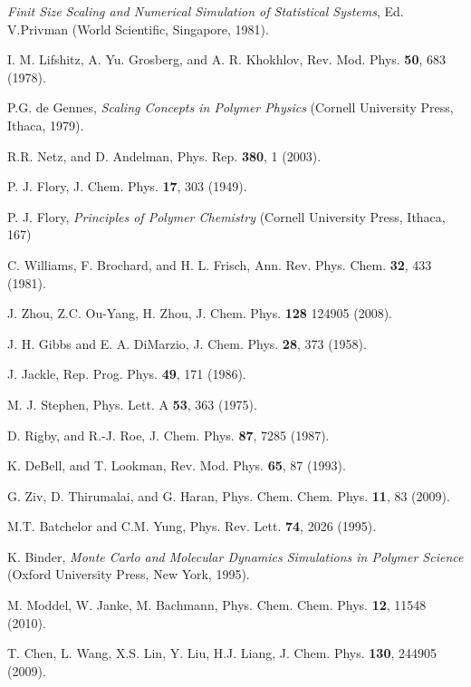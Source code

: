 \documentclass[aps,pre,twocolumn,showpacs,preprintnumbers,amsmath,amssymb]{revtex4-1}
\begin{document}
\begin{thebibliography}{10}

 {\it Finit Size Scaling and Numerical
Simulation of Statistical Systems}, Ed. V.Privman (World
Scientific, Singapore, 1981).


 I. M. Lifshitz, A. Yu. Grosberg, and A.
R. Khokhlov, Rev. Mod. Phys. {\bf 50}, 683 (1978).

 P.G. de Gennes, {\it Scaling Concepts
in Polymer Physics} (Cornell University Press, Ithaca, 1979).

 R.R. Netz, and D. Andelman, Phys. Rep. {\bf
380}, 1 (2003).

 P. J. Flory, J. Chem. Phys. {\bf 17}, 303
(1949).

 P. J. Flory, {\it Principles of Polymer
Chemistry} (Cornell University Press, Ithaca, 167)

 C. Williams, F. Brochard, and H. L.
Frisch, Ann. Rev. Phys. Chem. {\bf 32}, 433 (1981).

 J. Zhou, Z.C. Ou-Yang, H. Zhou, J. Chem. Phys.
{\bf 128} 124905 (2008).

 J. H. Gibbs and E. A. DiMarzio, J. Chem.
Phys. {\bf 28}, 373 (1958).

 J. Jackle, Rep. Prog. Phys. {\bf 49}, 171
(1986).

 M. J. Stephen, Phys. Lett. A {\bf 53},
363 (1975).

 D. Rigby, and R.-J. Roe, J. Chem. Phys.
{\bf 87}, 7285 (1987).

 K. DeBell, and T. Lookman, Rev. Mod. Phys.
{\bf 65}, 87 (1993).

 G. Ziv, D. Thirumalai, and G. Haran, Phys.
Chem. Chem. Phys. {\bf 11}, 83 (2009).

 M.T. Batchelor and C.M. Yung, Phys. Rev. Lett.
{\bf 74}, 2026 (1995).

 K. Binder, {\it Monte Carlo and Molecular
Dynamics Simulations in Polymer Science} (Oxford University
Press, New York, 1995).

 M. Moddel, W. Janke, M. Bachmann, Phys. Chem.
Chem. Phys. {\bf 12}, 11548 (2010).

 T. Chen, L. Wang, X.S. Lin, Y. Liu, H.J. Liang,
J. Chem. Phys. {\bf 130}, 244905 (2009).


\end{thebibliography}
\end{document}
